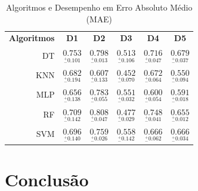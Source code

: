 \documentclass[12pt]{article}
\begin{document}
\begin{table}[h!]
  \begin{center}
    \caption{Algoritmos e Desempenho em Erro Absoluto Médio (MAE) }
    \label{tab_desempenho}
    \begin{tabular}{r|c|c|c|c|c}
      \textbf{Algoritmos} & \textbf{D1}                                    & \textbf{D2}                                    & \textbf{D3}                                    & \textbf{D4}                                     & \textbf{D5}                                     \\
      DT                  & \( \underset{_{-}^{+}\textrm{0.101}}{0.753} \) & \( \underset{_{-}^{+}\textrm{0.013}}{0.798} \) & \( \underset{_{-}^{+}\textrm{0.106}}{0.513} \) & \( \underset{_{-}^{+}\textrm{0.047}}{0.716} \)  & \( \underset{_{-}^{+}\textrm{0.037}}{0.679} \)  \\ \hline
      KNN                 & \( \underset{_{-}^{+}\textrm{0.194}}{0.682} \) & \( \underset{_{-}^{+}\textrm{0.133}}{0.607} \) & \( \underset{_{-}^{+}\textrm{0.070}}{0.452} \) & \( \underset{_{-}^{+}\textrm{0.064}}{0.672} \)  & \( \underset{_{-}^{+}\textrm{0.094}}{0.550 } \) \\ \hline
      MLP                 & \( \underset{_{-}^{+}\textrm{0.138}}{0.656} \) & \( \underset{_{-}^{+}\textrm{0.055}}{0.783} \) & \( \underset{_{-}^{+}\textrm{0.032}}{0.551} \) & \( \underset{_{-}^{+}\textrm{0.054}}{0.600} \)  & \( \underset{_{-}^{+}\textrm{0.018}}{0.591} \)  \\ \hline
      RF                  & \( \underset{_{-}^{+}\textrm{0.142}}{0.709} \) & \( \underset{_{-}^{+}\textrm{0.047}}{0.808} \) & \( \underset{_{-}^{+}\textrm{0.029}}{0.477} \) & \( \underset{_{-}^{+}\textrm{0.041}}{0.748} \)  & \( \underset{_{-}^{+}\textrm{0.012}}{0.655} \)  \\ \hline
      SVM                 & \( \underset{_{-}^{+}\textrm{0.140}}{0.696} \) & \( \underset{_{-}^{+}\textrm{0.026}}{0.759} \) & \( \underset{_{-}^{+}\textrm{0.142}}{0.558} \) & \( \underset{_{-}^{+}\textrm{0.062}}{0.666 } \) & \( \underset{_{-}^{+}\textrm{0.034}}{0.666} \)  \\ \hline
    \end{tabular}
  \end{center}
\end{table}



\section{Conclusão}\label{sec:figs}






\end{document}
